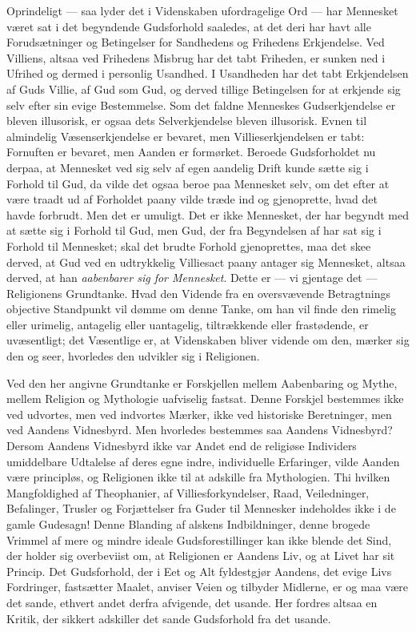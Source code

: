 \documentclass[12pt]{book}
\begin{document}
Oprindeligt --- saa lyder det i Videnskaben ufordragelige Ord ---
har Mennesket været sat i det begyndende Gudsforhold saaledes, at
det deri har havt alle Forudsætninger og Betingelser for Sandhedens
og Frihedens Erkjendelse. Ved Villiens, altsaa ved Frihedens Misbrug
har det tabt Friheden, er sunken ned i Ufrihed og dermed i personlig
Usandhed. I Usandheden har det tabt Erkjendelsen af Guds Villie, af
Gud som Gud, og derved tillige Betingelsen for at erkjende sig selv
efter sin evige Bestemmelse. Som det faldne Menneskes
Gudserkjendelse er bleven illusorisk, er ogsaa dets Selverkjendelse
bleven illusorisk. Evnen til almindelig Væsenserkjendelse er
bevaret, men Villieserkjendelsen er tabt: Fornuften er bevaret, men
Aanden er formørket. Beroede Gudsforholdet nu derpaa, at Mennesket
ved sig selv af egen aandelig Drift kunde sætte sig i Forhold til
Gud, da vilde det ogsaa beroe paa Mennesket selv, om det efter at
være traadt ud af Forholdet paany vilde træde ind og gjenoprette,
hvad det havde forbrudt. Men det er umuligt. Det er ikke Mennesket,
der har begyndt med at sætte sig i Forhold til Gud, men Gud, der fra
Begyndelsen af har sat sig i Forhold til Mennesket; skal det brudte
Forhold gjenoprettes, maa det skee derved, at Gud ved en udtrykkelig
Villiesact paany antager sig Mennesket, altsaa derved, at han
\emph{aabenbarer sig for Mennesket}. Dette er --- vi gjentage det
--- Religionens Grundtanke. Hvad den Vidende fra en oversvævende
Betragtnings objective Standpunkt vil dømme om denne Tanke, om han
vil finde den rimelig eller urimelig, antagelig eller uantagelig,
tiltrækkende eller frastødende, er uvæsentligt; det Væsentlige er,
at Videnskaben bliver vidende om den, mærker sig den og seer,
hvorledes den udvikler sig i Religionen.

Ved den her angivne Grundtanke er Forskjellen mellem Aabenbaring og
Mythe, mellem Religion og Mythologie uafviselig fastsat. Denne
Forskjel bestemmes ikke ved udvortes, men ved indvortes Mærker, ikke
ved historiske Beretninger, men ved Aandens Vidnesbyrd. Men
hvorledes bestemmes saa Aandens Vidnesbyrd? Dersom Aandens
Vidnesbyrd ikke var Andet end de religiøse Individers umiddelbare
Udtalelse af deres egne indre, individuelle Erfaringer, vilde Aanden
være principløs, og Religionen ikke til at adskille fra
Mythologien. Thi hvilken Mangfoldighed af Theophanier, af
Villiesforkyndelser, Raad, Veiledninger, Befalinger, Trusler og
Forjættelser fra Guder til Mennesker indeholdes ikke i de gamle
Gudesagn! Denne Blanding af alskens Indbildninger, denne brogede
Vrimmel af mere og mindre ideale Gudsforestillinger kan ikke blende
det Sind, der holder sig overbeviist om, at Religionen er Aandens
Liv, og at Livet har sit Princip. Det Gudsforhold, der i Eet og Alt
fyldestgjør Aandens, det evige Livs Fordringer, fastsætter Maalet,
anviser Veien og tilbyder Midlerne, er og maa være det sande,
ethvert andet derfra afvigende, det usande. Her fordres altsaa en
Kritik, der sikkert adskiller det sande Gudsforhold fra det usande.
\end{document}
